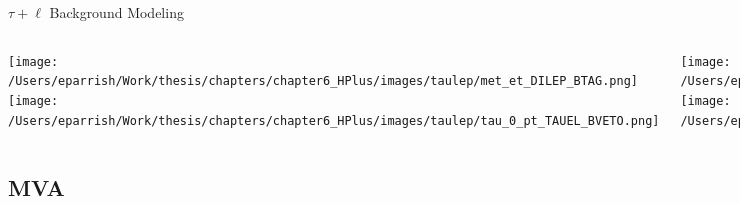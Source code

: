 \documentclass[aspectratio=169,xcolor=table]{beamer}
\begin{document}
    \begin{frame}[t]{$\tau+\ell$ Background Modeling}
      \begin{columns}[t]

        \texttt{[image: /Users/eparrish/Work/thesis/chapters/chapter6\_HPlus/images/taulep/met\_et\_DILEP\_BTAG.png]}
        \texttt{[image: /Users/eparrish/Work/thesis/chapters/chapter6\_HPlus/images/taulep/tau\_0\_pt\_TAUEL\_BVETO.png]}

        \texttt{[image: /Users/eparrish/Work/thesis/chapters/chapter6\_HPlus/images/taulep/lep\_0\_pt\_DILEP\_BTAG.png]}
        \texttt{[image: /Users/eparrish/Work/thesis/chapters/chapter6\_HPlus/images/taulep/lep\_0\_pt\_TAUEL\_BVETO.png]}

        \texttt{[image: /Users/eparrish/Work/thesis/chapters/chapter6\_HPlus/images/taulep/tau\_0\_pt\_SS\_TAUEL.png]}
        \texttt{[image: /Users/eparrish/Work/thesis/chapters/chapter6\_HPlus/images/taulep/tau\_0\_pt\_SS\_TAUMU.png]}


        \texttt{[image: /Users/eparrish/Work/thesis/chapters/chapter6\_HPlus/images/taulep/lep\_0\_pt\_SS\_TAUEL.png]}
        \texttt{[image: /Users/eparrish/Work/thesis/chapters/chapter6\_HPlus/images/taulep/lep\_0\_pt\_SS\_TAUMU.png]}

      \end{columns}
    \end{frame}

  \subsection{ MVA }
\end{document}
